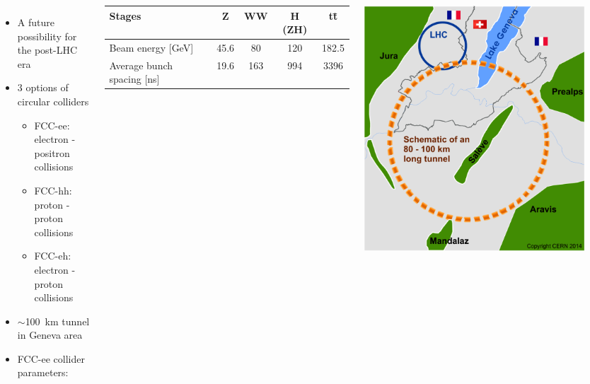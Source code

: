 \documentclass[final,xcolor={dvipsnames,svgnames,x11names,table}]{beamer}
\begin{document}
\begin{frame}
\begin{textblock}{40}
\begin{tcolorbox}[title=The Future Circular Collider Experiment (FCC)]
  \begin{columns}
      \begin{itemize}
        \item A future possibility for the post-LHC era
        \item 3 options of circular colliders
          \begin{itemize}
            \item FCC-ee: electron - positron collisions
            \item FCC-hh: proton - proton collisions
            \item FCC-eh: electron - proton collisions
          \end{itemize}
        \item $\sim$100~km tunnel in Geneva area
        \item FCC-ee collider parameters:
      \end{itemize}
        \centering
      	\begin{tabular}{l c c c c}
        	\toprule
      	   Stages & Z & WW & H (ZH) & t\={t} \\
      	   \midrule
           Beam energy [GeV] & 45.6 & 80 & 120 & 182.5 \\
           Average bunch spacing [ns] & 19.6 & 163 & 994 & 3396\\
      	   \bottomrule
      	\end{tabular}

      \centering
      \includegraphics[width=0.9\textwidth]{Figures/cernFCC}
  \end{columns}


\end{tcolorbox}
\end{textblock}
\end{frame}
\end{document}
